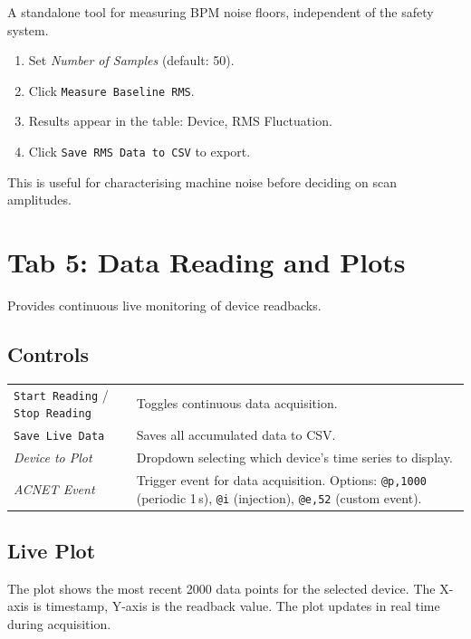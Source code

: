 \documentclass[11pt,a4paper,twoside]{report}
\newcommand{\btn}[1]{\colorbox{accent!12}{\texttt{\small #1}}}
\newcommand{\field}[1]{\textit{#1}}
\begin{document}
A standalone tool for measuring BPM noise floors, independent of the safety system.

\begin{enumerate}
  \item Set \field{Number of Samples} (default: 50).
  \item Click \btn{Measure Baseline RMS}.
  \item Results appear in the table: Device, RMS Fluctuation.
  \item Click \btn{Save RMS Data to CSV} to export.
\end{enumerate}

This is useful for characterising machine noise before deciding on scan amplitudes.

\section{Tab 5: Data Reading and Plots}\label{sec:tab5}

Provides continuous live monitoring of device readbacks.

\subsection{Controls}

\begin{tabularx}{\textwidth}{lX}
  \toprule
  \btn{Start Reading} / \btn{Stop Reading} & Toggles continuous data acquisition. \\
  \btn{Save Live Data}   & Saves all accumulated data to CSV. \\
  \field{Device to Plot}  & Dropdown selecting which device's time series to display. \\
  \field{ACNET Event}     & Trigger event for data acquisition. Options: \texttt{@p,1000} (periodic 1\,s), \texttt{@i} (injection), \texttt{@e,52} (custom event). \\
  \bottomrule
\end{tabularx}

\subsection{Live Plot}

The plot shows the most recent 2000 data points for the selected device. The X-axis is timestamp, Y-axis is the readback value. The plot updates in real time during acquisition.
\end{document}

